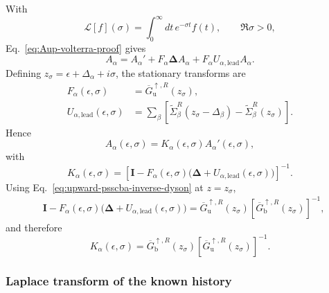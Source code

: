 \documentclass[
 reprint,
 superscriptaddress,
 amsmath,amssymb,
 aps,prb,
 longbibliography,
 floatfix
]{revtex4-2}
\newcommand{\lead}{\mathrm{lead}}
\begin{document}
With
\begin{equation}
\mathcal L[f](\sigma)
=
\int_0^\infty dt\,e^{-\sigma t}f(t),
\qquad
\Re\sigma>0,
\label{eq:laplace-proof}
\end{equation}
Eq.~\eqref{eq:Aup-volterra-proof} gives
\begin{equation*}
A_\alpha
=
A_\alpha'
+
F_\alpha\bm\Delta A_\alpha
+
F_\alpha U_{\alpha,\lead}A_\alpha.
\end{equation*}
Defining $z_\sigma=\epsilon+\Delta_\alpha+i\sigma$, the stationary transforms are
\begin{align*}
F_\alpha(\epsilon,\sigma)
&=
\overline G_{\mathrm u}^{\uparrow,R}(z_\sigma),
\\
U_{\alpha,\lead}(\epsilon,\sigma)
&=
\sum_\beta
\left[
\widetilde\Sigma_\beta^R(z_\sigma-\Delta_\beta)
-
\widetilde\Sigma_\beta^R(z_\sigma)
\right].
\end{align*}
Hence
\begin{equation*}
A_\alpha(\epsilon,\sigma)
=
K_\alpha(\epsilon,\sigma)
A_\alpha'(\epsilon,\sigma),
\end{equation*}
with
\begin{equation*}
K_\alpha(\epsilon,\sigma)
=
\left[
\bm I
-
F_\alpha(\epsilon,\sigma)
\bigl(\bm\Delta+U_{\alpha,\lead}(\epsilon,\sigma)\bigr)
\right]^{-1}.
\end{equation*}
Using Eq.~\eqref{eq:upward-psscba-inverse-dyson} at $z=z_\sigma$,
\begin{align*}
&\bm I
-
F_\alpha(\epsilon,\sigma)
\bigl(\bm\Delta+U_{\alpha,\lead}(\epsilon,\sigma)\bigr)
=
\overline G_{\mathrm u}^{\uparrow,R}(z_\sigma)
\left[
\overline G_{\mathrm b}^{\uparrow,R}(z_\sigma)
\right]^{-1},
\end{align*}
and therefore
\begin{equation*}
K_\alpha(\epsilon,\sigma)
=
\overline G_{\mathrm b}^{\uparrow,R}(z_\sigma)
\left[
\overline G_{\mathrm u}^{\uparrow,R}(z_\sigma)
\right]^{-1}.
\end{equation*}

\subsubsection{Laplace transform of the known history}
\label{subsubsec:up-A-prime-laplace}
\end{document}
